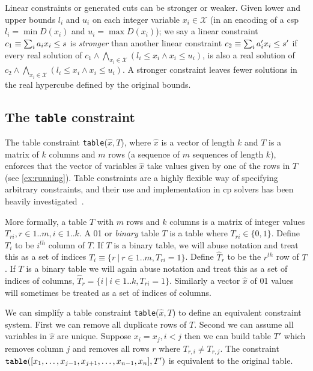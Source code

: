 \documentclass[a4paper,UKenglish,cleveref,autoref,thm-restate]{lipics-v2021}
\begin{document}
Linear constraints or generated cuts can be stronger or weaker.
Given lower and upper bounds $l_i$ and 
$u_i$ on each integer variable $x_i \in \mathcal{X}$
(in an encoding of a \gls{csp} $l_i = \min D(x_i)$ and
$u_i = \max D(x_i)$); 
we say a linear constraint 
$c_1 \equiv \sum_{i} a_i x_i \leq s$ is
\emph{stronger} than another linear constraint
$c_2 \equiv \sum_{i} a'_i x_i \leq s'$ if every real solution
of $c_1 \wedge \bigwedge_{x_i \in \mathcal{X}} (l_i \leq x_i \wedge x_i \leq u_i)$, is also a real solution of 
$c_2 \wedge \bigwedge_{x_i \in \mathcal{X}} (l_i \leq x_i \wedge x_i \leq u_i)$. 
A stronger constraint leaves fewer solutions in the real hypercube defined by the original bounds.



\subsection{The \texttt{table} constraint}
\label{sec:background:tables}

The table constraint \texttt{table}($\hat{x}, T$),
where $\hat{x}$ is a vector of length $k$ and $T$ is a matrix of $k$ columns and $m$ rows (a sequence of $m$ sequences of length $k$), enforces that the vector of variables $\hat{x}$ take values given by one of the rows in $T$ (see \cref{ex:running}). 
Table constraints are a highly flexible way of specifying arbitrary constraints,
and their use and implementation in \gls{cp} solvers has been heavily investigated~\cite{GAC,STR2,rolandtable}.

More formally,
a table $T$ with $m$ rows and $k$ columns is a matrix of integer values 
$T_{ri}, r \in 1..m, i \in 1..k$.
A 01 or \emph{binary} table $T$ is a table where $T_{ri} \in \{0,1\}$.
Define ${T}_i$ to be $i^{th}$ column of $T$.
If $T$ is a binary table, we will abuse notation and treat this as a set of indices $T_i \equiv \{ r ~|~ r \in 1..m, T_{ri} = 1\}$.
Define $\hat{T}_r$ to be the $r^{th}$ row of $T$.
If $T$ is a binary table we will again abuse notation and treat this as a set of indices of columns, $\hat{T}_r = \{ i ~|~ i \in 1..k, T_{ri} = 1\}$.
Similarly a vector 
$\hat{x}$ of 01 values will sometimes be treated as a set of indices of columns.



We can simplify a table constraint \texttt{table}($\hat{x}, T$) to define an equivalent constraint system.
First we can remove all duplicate rows of $T$.
Second we can assume all variables in $\hat{x}$ are unique.
Suppose $x_i = x_j, i < j$ then we can build table $T'$ which removes column $j$ and removes all rows $r$ where $T_{r,i} \neq T_{r,j}$.
The constraint $\texttt{table}([x_1, \ldots, x_{j-1}, x_{j+1}, \ldots, x_{n-1}, x_n], T')$ is equivalent to the original table.
\end{document}
